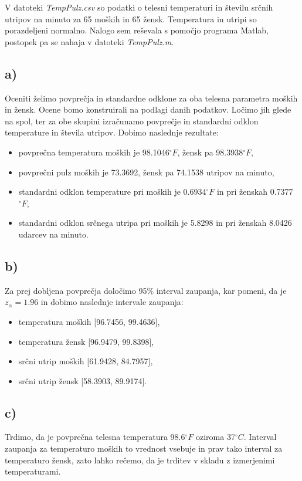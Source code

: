 \documentclass[A4paper, 11pt]{article}
\begin{document}
V datoteki \textit{TempPulz.csv} so podatki o telesni temperaturi in številu srčnih utripov na minuto za 65 moških in 65 žensk. Temperatura in utripi so porazdeljeni normalno. Nalogo sem reševala s pomočjo programa Matlab, postopek pa se nahaja v datoteki \textit{TempPulz.m}.

\subsection*{a)}
Oceniti želimo povprečja in standardne odklone za oba telesna parametra moških in žensk. Ocene bomo konstruirali na podlagi danih podatkov. Ločimo jih glede na spol, ter za obe skupini izračunamo povprečje in standardni odklon temperature in števila utripov.
Dobimo naslednje rezultate:
\begin{itemize}
\item povprečna temperatura moških je 98.1046$^{\circ}F$, žensk pa 98.3938$^{\circ}F$,
\item povprečni pulz moških je 73.3692, žensk pa 74.1538 utripov na minuto,
\item standardni odklon temperature pri moških je 0.6934$^{\circ}F$ in pri ženskah 0.7377$^{\circ}F$,
\item standardni odklon srčnega utripa pri moških je 5.8298 in pri ženskah 8.0426 udarcev na minuto. 
\end{itemize}

\subsection*{b)}
Za prej dobljena povprečja določimo 95\% interval zaupanja, kar pomeni, da je $z_\alpha = 1.96$ in dobimo naslednje intervale zaupanja:
\begin{itemize}
\item temperatura moških [96.7456, 99.4636],
\item temperatura žensk [96.9479, 99.8398],
\item srčni utrip moških [61.9428, 84.7957],
\item srčni utrip žensk [58.3903, 89.9174].
\end{itemize}

\subsection*{c)}
Trdimo, da je povprečna telesna temperatura 98.6$^{\circ}F$ oziroma 37$^{\circ}C$. Interval zaupanja za temperaturo moških to vrednost vsebuje in prav tako interval za temperaturo žensk, zato lahko rečemo, da je trditev v skladu z izmerjenimi temperaturami.
\end{document}
